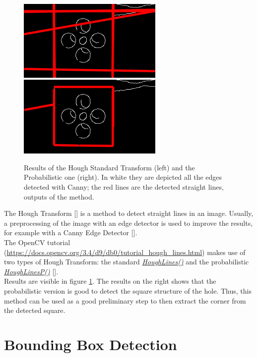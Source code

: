 \begin{figure}[H]
	\centering
	\centerline{
		\includegraphics[width=7.0cm]{canny_HoughStandard}
		\qquad
		\includegraphics[width=7.0cm]{canny_HoughProb}
	}
	\caption[Results of the Standard Hough Transform and the Probabilistic one]{Results of the Hough Standard Transform (left) and the Probabilistic one (right). In white they are depicted all the edges detected with Canny; the red lines are the detected straight lines, outputs of the method.}
	\label{fig:HoughStandard}
\end{figure}

The Hough Transform [\cite{DudaHoughTrasf}] is a method to detect straight lines in an image. Usually, a preprocessing of the image with an edge detector is used to improve the results, for example with a Canny Edge Detector [\cite{CannyEdge}].\\

The OpenCV tutorial (\url{https://docs.opencv.org/3.4/d9/db0/tutorial_hough_lines.html}) makes use of two types of Hough Transform: the standard \href{https://docs.opencv.org/3.4/dd/d1a/group__imgproc__feature.html#ga46b4e588934f6c8dfd509cc6e0e4545a}{\textit{HoughLines()}} and the probabilistic \href{https://docs.opencv.org/3.4/dd/d1a/group__imgproc__feature.html#ga8618180a5948286384e3b7ca02f6feeb}{\textit{HoughLinesP()}} [\cite{houghprob}].\\
Results are visible in figure \ref{fig:HoughStandard}. The results on the right shows that the probabilistic version is good to detect the square structure of the hole. 
Thus, this method can be used as a good preliminary step to then extract the corner from the detected square.

\newpage
\section{Bounding Box Detection}
\label{sec:boundingBox}

